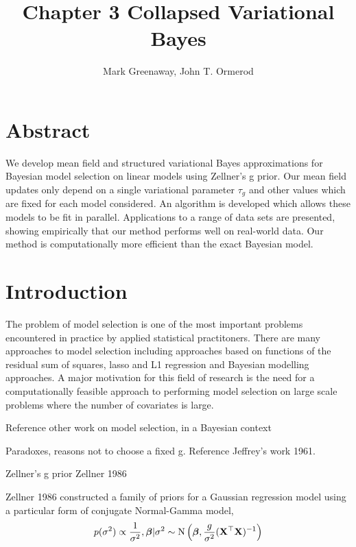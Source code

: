 \documentclass{amsart}[12pt]
\title{Chapter 3 Collapsed Variational Bayes}
\author{Mark Greenaway, John T. Ormerod}
\begin{document}
\maketitle

\section*{Abstract}


We develop mean field and structured variational Bayes approximations for Bayesian model selection on linear
models using Zellner's g prior. Our mean field updates only depend on a single variational parameter $\tau_g$
and other values which are fixed for each model considered. An algorithm is developed which allows these
models to be fit in parallel. Applications to a range of data sets are presented, showing  empirically that
our method performs well on real-world data. Our method is computationally more efficient  than the exact
Bayesian model.

\section{Introduction}

The problem of model selection is one of the most important problems encountered in practice by applied
statistical practitoners. There are many approaches to model selection including approaches based on functions
of the residual sum of squares, lasso and L1 regression and Bayesian modelling approaches. A major motivation
for this field of research is the need for a computationally feasible approach to performing model  selection
on large scale problems where the number of covariates is large.


Reference other work on model selection, in a Bayesian context

Paradoxes, reasons not to choose a fixed g. Reference Jeffrey's work 1961.

Zellner's g prior Zellner 1986

Zellner 1986 constructed a family of priors for a Gaussian regression model using a particular form
of conjugate Normal-Gamma model,
\begin{equation*}
p(\sigma^2) \propto \frac{1}{\sigma^2}, {\boldsymbol \beta}|\sigma^2 \sim \text{N}\left({\boldsymbol \beta}, \frac{g}{\sigma^2} ({\bf X}^\top {\bf X})^{-1}\right)
\end{equation*}
\end{document}
